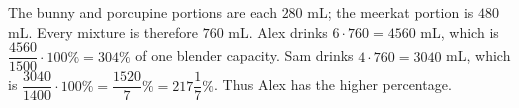 The bunny and porcupine portions are each $280$ mL; the meerkat portion is $480$ mL. Every mixture is therefore $760$ mL. Alex drinks $6\cdot760=4560$ mL, which is $\dfrac{4560}{1500}\cdot100\%=304\%$ of one blender capacity. Sam drinks $4\cdot760=3040$ mL, which is $\dfrac{3040}{1400}\cdot100\%=\dfrac{1520}{7}\%=217\dfrac{1}{7}\%$. Thus Alex has the higher percentage.
